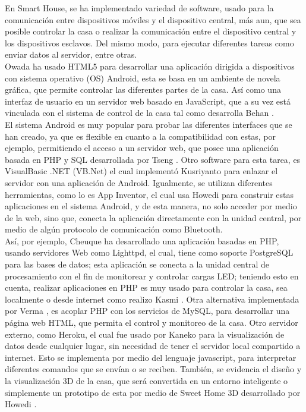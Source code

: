 En Smart House, se ha implementado variedad de software, usado para la comunicación entre dispositivos móviles y el dispositivo central, más aun, que sea posible controlar la casa o realizar la comunicación entre el dispositivo central y los dispositivos esclavos. Del mismo modo, para ejecutar diferentes tareas como enviar datos al servidor, entre otras.\\

Owada \cite{Owada2012} ha usado HTML5 para desarrollar una aplicación dirigida a dispositivos con sistema operativo (OS) Android, esta se basa en un ambiente de novela gráfica, que permite controlar las diferentes partes de la casa. Así como una interfaz de usuario en un servidor web basado en JavaScript, que a su vez está vinculada con el sistema de control de la casa tal como desarrolla Behan \cite{Behan2013}.\\

El sistema Android es muy popular para probar las diferentes interfaces que se han creado, ya que es flexible en cuanto a la compatibilidad con estas, por ejemplo, permitiendo el acceso a un servidor web, que posee una aplicación basada en PHP y SQL desarrollada por Tseng \cite{Tseng2014}. Otro software para esta tarea, es VisualBasic .NET (VB.Net) el cual implementó Kusriyanto \cite{Kusriyanto2015} para enlazar el servidor con una aplicación de Android. Igualmente, se utilizan diferentes herramientas, como lo es App Inventor, el cual usa Howedi \cite{Howedi2016} para construir estas aplicaciones en el sistema Android, y de esta manera, no solo acceder por medio de la web, sino que, conecta la aplicación directamente con la unidad central, por medio de algún protocolo de comunicación  como Bluetooth. \\

Así, por ejemplo, Cheuque \cite{Cheuque2015} ha desarrollado una aplicación basadas en PHP, usando servidores Web como Lighttpd, el cual, tiene como soporte PostgreSQL para las bases de datos; esta aplicación se conecta a la unidad central de procesamiento con el fin de monitorear y controlar cargas LED; teniendo esto en cuenta, realizar aplicaciones en PHP es muy usado para controlar la casa, sea localmente o desde internet como realizo Kasmi \cite{Kasmi2016}. Otra alternativa implementada por Verma \cite{Verma2016}, es acoplar PHP con los servicios de MySQL, para desarrollar una página web HTML, que permita el control y monitoreo de la casa. Otro servidor externo, como Heroku, el cual fue usado por Kaneko \cite{Kaneko2017} para la visualización de datos desde cualquier lugar, sin necesidad de tener el servidor local compartido a internet. Esto se implementa por medio del lenguaje javascript, para interpretar diferentes comandos que se envían o se reciben. También, se evidencia el diseño y la visualización 3D de la casa, que será convertida en un entorno inteligente o simplemente un prototipo de esta por medio de Sweet Home 3D desarrollado por Howedi \cite{Howedi2016}.\\

